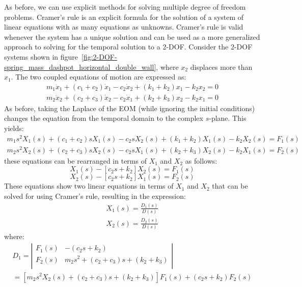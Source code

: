 \documentclass[12pt,letter]{article}
\begin{document}
	
	As before, we can use explicit methods for solving multiple degree of freedom problems. 
	Cramer's rule is an explicit formula for the solution of a system of linear equations with as many equations as unknowns. Cramer's rule is valid whenever the system has a unique solution and can be used as a more generalized approach to solving for the temporal solution to a 2-DOF. Consider the 2-DOF systems shown in figure~\ref{fig:2-DOF-spring_mass_dashpot_horizontal_double_wall}, where $x_2$ displaces more than $x_1$. The two coupled equations of motion are expressed as: 
	\begin{eqnarray}
	m_1\ddot{x}_1 + (c_1+c_2)\dot{x}_1 - c_2\dot{x}_2 + (k_1+k_2)x_1 - k_2x_2 =0 \\
	m_2\ddot{x}_2 + (c_2+c_3)\dot{x}_2 - c_2\dot{x}_1 + (k_2+k_3)x_2 - k_2x_1 =0 \nonumber
	\end{eqnarray}
	As before, taking the Laplace of the EOM (while ignoring the initial conditions) changes the equation from the temporal domain to the complex $s$-plane. This yields:
	\begin{eqnarray}
	m_1 s^2 X_1(s) + (c_1 + c_2)sX_1(s) - c_2sX_2(s) + (k_1+k_2)X_1(s) - k_2X_2(s) = F_1(s) \\
	m_2 s^2 X_2(s) + (c_2 + c_3)sX_2(s) - c_2sX_1(s) + (k_2+k_3)X_2(s) - k_2X_1(s) = F_2(s) \nonumber
	\end{eqnarray}
	these equations can be rearranged in terms of $X_1$ and $X_2$ as follows:
	\begin{equation}
	[m_1 s^2 + (c_1 + c_2)s + (k_1+k_2)]X_1(s) - [c_2s+k_2]X_2(s) = F_1(s) 
	\end{equation}
	\begin{equation}
	[m_2 s^2 + (c_2 + c_3)s + (k_2+k_3)]X_2(s) - [c_2s+k_2]X_1(s) = F_2(s) \nonumber
	\end{equation}
	These equations show two linear equations in terms of $X_1$ and $X_2$ that can be solved for using Cramer's rule, resulting in the expression:
	\begin{eqnarray}
	X_1(s) = \frac{D_1(s)}{D(s)} \\
	X_2(s) = \frac{D_2(s)}{D(s)} \nonumber
	\end{eqnarray}
	where:
	\begin{eqnarray}
	D_1 = \left|
	\begin{array}{cc}
	F_1(s)  & -(c_2s+k_2) \\
	F_2(s)  & m_2 s^2 + (c_2 + c_3)s + (k_2+k_3) \\
	\end{array}
	\right| \\
	= [m_2 s^2 X_2(s) + (c_2 + c_3)s +(k_2+k_3)]F_1(s) + (c_2s+k_2)F_2(s)  \nonumber
	\end{eqnarray}
	
\end{document}

